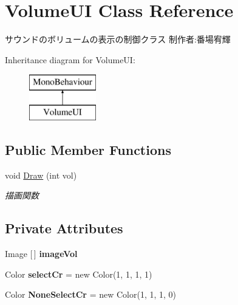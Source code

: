 \hypertarget{class_volume_u_i}{}\section{Volume\+UI Class Reference}
\label{class_volume_u_i}


サウンドのボリュームの表示の制御クラス 制作者\+:番場宥輝  


Inheritance diagram for Volume\+UI\+:\begin{figure}[H]
\begin{center}
\leavevmode
\includegraphics[height=2.000000cm]{class_volume_u_i}
\end{center}
\end{figure}
\subsection*{Public Member Functions}
\begin{DoxyCompactItemize}
\item 
void \hyperlink{class_volume_u_i_aad38931629b297f4017f064a298d4b5e}{Draw} (int vol)
\begin{DoxyCompactList}\small\item\em 描画関数 \end{DoxyCompactList}\end{DoxyCompactItemize}
\subsection*{Private Attributes}
\begin{DoxyCompactItemize}
\item 
\mbox{\label{class_volume_u_i_a9c744cb1740cf553e66d190e41a97231}} 
Image \mbox{[}$\,$\mbox{]} {\bfseries image\+Vol}
\item 
\mbox{\label{class_volume_u_i_a86defed4051258daa23c487125d40fd9}} 
Color {\bfseries select\+Cr} = new Color(1, 1, 1, 1)
\item 
\mbox{\label{class_volume_u_i_a851aec8bb5af883be9eb2300990dd4c8}} 
Color {\bfseries None\+Select\+Cr} = new Color(1, 1, 1, 0)
\end{DoxyCompactItemize}



